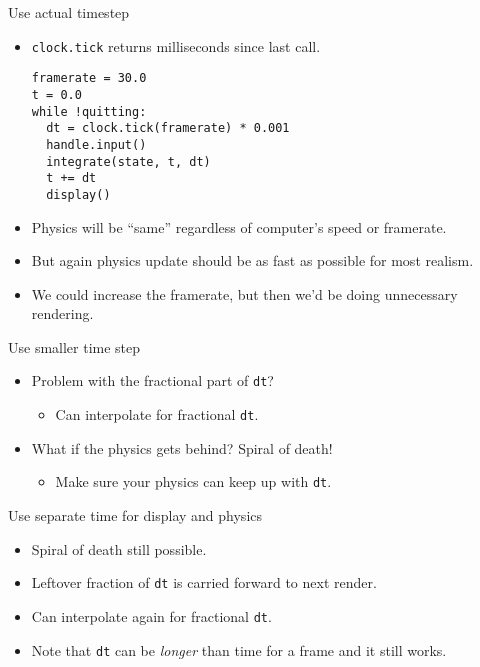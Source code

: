 \documentclass{beamer}
\newcommand{\bframe}[1]{\begin{frame}[fragile]{#1}}
\begin{document}
\bframe{Use actual timestep}
\begin{itemize}
\item {\tt clock.tick} returns milliseconds since last call.
  \begin{Verbatim}[frame=single]
framerate = 30.0
t = 0.0
while !quitting:
  dt = clock.tick(framerate) * 0.001
  handle.input()
  integrate(state, t, dt)
  t += dt       
  display()
  \end{Verbatim}
  \item Physics will be ``same'' regardless of computer's speed or framerate.
\item But again physics update should be as fast as possible
  for most realism.
  \item We could increase the framerate, but then we'd be doing
    unnecessary rendering.
\end{itemize}
\end{frame}

\bframe{Use smaller time step}
\begin{itemize}
  \begin{Verbatim}[frame=single]
framerate = 30.0
t = 0.0
dt = 0.01
while !quitting:
  timespan = clock.tick(framerate) * 0.001
  handle.input()
  while (timespan > 0):
    integrate(state, t, dt)
    timespan -= dt
  display()
\end{Verbatim}
\item Problem with the fractional part of {\tt dt}?
  \begin{itemize}  \item Can interpolate for fractional {\tt dt}.
    \end{itemize}
\item What if the physics gets behind?  Spiral of death!
  \begin{itemize}
  \item Make sure your physics can keep up with {\tt dt}.
    \end{itemize}
\end{itemize}
\end{frame}

\bframe{Use separate time for display and physics}
\begin{itemize}
  \begin{Verbatim}[frame=single]
framerate = 30.0
rendertime, physicstime = 0.0, 0.0
dt = 0.01
while !quitting:
  rendertime += clock.tick(framerate) * 0.001
  handle.input()
  while (physicstime < rendertime):
    integrate(state, physicstime, dt)
    physicstime += dt
  display()
\end{Verbatim}
\item Spiral of death still possible.
  
  \item Leftover fraction of {\tt dt} is carried forward to next
    render. 
  \item Can interpolate again for fractional {\tt dt}.
\item Note that {\tt dt} can be {\em longer} than time for a frame and it still
  works.
\end{itemize}
\end{frame}
\end{document}
